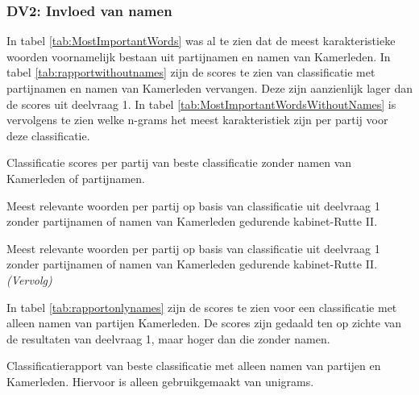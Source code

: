 \subsubsection{DV2: Invloed van namen}
In tabel \ref{tab:MostImportantWords} was al te zien dat de meest karakteristieke woorden voornamelijk bestaan uit partijnamen en namen van Kamerleden. In tabel \ref{tab:rapportwithoutnames} zijn de scores te zien van classificatie met partijnamen en namen van Kamerleden vervangen. Deze zijn aanzienlijk lager dan de scores uit deelvraag 1. In tabel \ref{tab:MostImportantWordsWithoutNames} is vervolgens te zien welke n-grams het meest karakteristiek zijn per partij voor deze classificatie.\par
\begin{table}[H]
\caption{Classificatie scores per partij van beste classificatie zonder namen van Kamerleden of partijnamen.}
\label{tab:rapportwithoutnames}
\centering

\end{table}

\begin{table}[H] 
\caption{Meest relevante woorden per partij op basis van classificatie uit deelvraag 1 zonder partijnamen of namen van Kamerleden gedurende kabinet-Rutte II.} 
\label{tab:MostImportantWordsWithoutNames} 
\centering
\hspace*{-1in}
 
\end{table} 
\addtocounter{table}{-1} 
\begin{table}[H] 
\caption{Meest relevante woorden per partij op basis van classificatie uit deelvraag 1 zonder partijnamen of namen van Kamerleden gedurende kabinet-Rutte II. \emph{(Vervolg)}} 
\centering
\hspace*{-0.6in}
 
\end{table}

In tabel \ref{tab:rapportonlynames} zijn de scores te zien voor een classificatie met alleen namen van partijen Kamerleden. De scores zijn gedaald ten op zichte van de resultaten van deelvraag 1, maar hoger dan die zonder namen.\par
\begin{table}[H]
\caption{Classificatierapport van beste classificatie met alleen namen van partijen en Kamerleden. Hiervoor is alleen gebruikgemaakt van unigrams.}
\label{tab:rapportonlynames}
\centering

\end{table}


